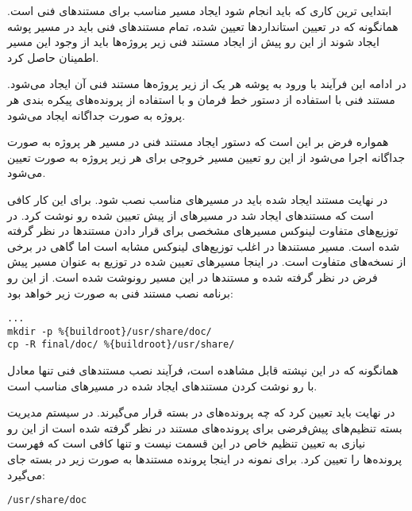 ابتدایی ترین کاری که باید انجام شود ایجاد مسیر مناسب برای مستند‌های فنی است.
همانگونه که در تعیین استانداردها تعیین شده، تمام مستند‌های فنی باید در مسیر پوشه
 ایجاد شوند از این رو پیش از ایجاد مستند فنی زیر پروژه‌ها باید از
وجود این مسیر اطمینان حاصل کرد.

در ادامه این فرآیند با ورود به پوشه هر یک از زیر پروژه‌ها مستند فنی آن ایجاد
می‌شود. مستند فنی با استفاده از دستور خط فرمان  و با استفاده
از پرونده‌های پیکره بندی هر پروژه به صورت جداگانه ایجاد می‌شود. 

\begin{note}
همواره فرض بر این است که دستور ایجاد مستند فنی در مسیر هر پروژه به صورت جداگانه
اجرا می‌شود از این رو تعیین مسیر خروجی برای هر زیر پروژه به صورت
 تعیین می‌شود.
\end{note}

در نهایت مستند ایجاد شده باید در مسیرهای مناسب نصب شود. برای این کار کافی است که
مستندهای ایجاد شد در مسیرهای از پیش تعیین شده رو نوشت کرد. در توزیع‌های متفاوت
لینوکس مسیرهای مشخصی برای قرار دادن مستندها در نظر گرفته شده است. مسیر مستندها
در اغلب توزیع‌های لینوکس مشابه است اما گاهی در برخی از نسخه‌های متفاوت است. در
اینجا مسیرهای تعیین شده در توزیع  به عنوان مسیر پیش فرض در نظر
گرفته شده و مستندها در این مسیر رونوشت شده است. از این رو برنامه نصب مستند فنی
به صورت زیر خواهد بود:

\begin{latin}
\lstset{language=TeX}  
\begin{lstlisting}[frame=single] 
%install
...
mkdir -p %{buildroot}/usr/share/doc/
cp -R final/doc/ %{buildroot}/usr/share/
\end{lstlisting}
\end{latin}

همانگونه که در این نپشته قابل مشاهده است، فرآیند نصب مستندهای فنی تنها معادل با
رو نوشت کردن مستندهای ایجاد شده در مسیرهای مناسب است. 

در نهایت باید تعیین کرد که چه پرونده‌های در بسته قرار می‌گیرند. در سیستم مدیریت
بسته  تنظیم‌های پیش‌فرضی برای پرونده‌های مستند در نظر گرفته شده است از
این رو نیازی به تعیین تنظیم خاص در این قسمت نیست و تنها کافی است که فهرست
پرونده‌ها را تعیین کرد. برای نمونه در اینجا پرونده مستندها به صورت زیر در بسته
جای می‌گیرد:

\begin{latin}
\lstset{language=TeX}  
\begin{lstlisting}[frame=single] 
%docdir /usr/share/doc
/usr/share/doc
\end{lstlisting}
\end{latin}

